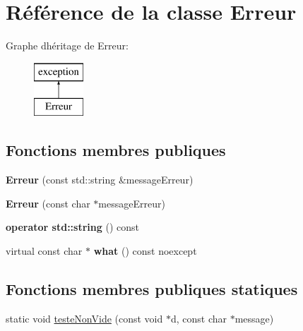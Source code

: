 \hypertarget{class_erreur}{}\section{Référence de la classe Erreur}
\label{class_erreur}
Graphe d\textquotesingle{}héritage de Erreur\+:\begin{figure}[H]
\begin{center}
\leavevmode
\includegraphics[height=2.000000cm]{class_erreur}
\end{center}
\end{figure}
\subsection*{Fonctions membres publiques}
\begin{DoxyCompactItemize}
\item 
\mbox{\label{class_erreur_a73d8d3c713bc18afd6a38cf337dfbb40}} 
{\bfseries Erreur} (const std\+::string \&message\+Erreur)
\item 
\mbox{\label{class_erreur_a15bbbbc7e23e4ea5e6bdebe8e299e6be}} 
{\bfseries Erreur} (const char $\ast$message\+Erreur)
\item 
\mbox{\label{class_erreur_a3a6fad6fcd3013b877c8ee838445ebec}} 
{\bfseries operator std\+::string} () const
\item 
\mbox{\label{class_erreur_a6843f7a2b86078ec1318548903d15326}} 
virtual const char $\ast$ {\bfseries what} () const noexcept
\end{DoxyCompactItemize}
\subsection*{Fonctions membres publiques statiques}
\begin{DoxyCompactItemize}
\item 
static void \mbox{\hyperlink{class_erreur_ad318a27a06c5c1f68506eb00b9fe6beb}{teste\+Non\+Vide}} (const void $\ast$d, const char $\ast$message)
\end{DoxyCompactItemize}

